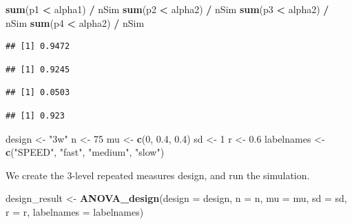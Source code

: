 \documentclass[
]{book}
\newenvironment{Shaded}{\begin{snugshade}}{\end{snugshade}}
\newcommand{\DataTypeTok}[1]{\textcolor[rgb]{0.13,0.29,0.53}{#1}}
\newcommand{\DecValTok}[1]{\textcolor[rgb]{0.00,0.00,0.81}{#1}}
\newcommand{\FloatTok}[1]{\textcolor[rgb]{0.00,0.00,0.81}{#1}}
\newcommand{\KeywordTok}[1]{\textcolor[rgb]{0.13,0.29,0.53}{\textbf{#1}}}
\newcommand{\NormalTok}[1]{#1}
\newcommand{\OperatorTok}[1]{\textcolor[rgb]{0.81,0.36,0.00}{\textbf{#1}}}
\newcommand{\StringTok}[1]{\textcolor[rgb]{0.31,0.60,0.02}{#1}}
\begin{document}
\begin{Shaded}
\begin{Highlighting}[]
\KeywordTok{sum}\NormalTok{(p1 }\OperatorTok{<}\StringTok{ }\NormalTok{alpha1) }\OperatorTok{/}\StringTok{ }\NormalTok{nSim}
\KeywordTok{sum}\NormalTok{(p2 }\OperatorTok{<}\StringTok{ }\NormalTok{alpha2) }\OperatorTok{/}\StringTok{ }\NormalTok{nSim}
\KeywordTok{sum}\NormalTok{(p3 }\OperatorTok{<}\StringTok{ }\NormalTok{alpha2) }\OperatorTok{/}\StringTok{ }\NormalTok{nSim}
\KeywordTok{sum}\NormalTok{(p4 }\OperatorTok{<}\StringTok{ }\NormalTok{alpha2) }\OperatorTok{/}\StringTok{ }\NormalTok{nSim}
\end{Highlighting}
\end{Shaded}

\begin{verbatim}
## [1] 0.9472
\end{verbatim}

\begin{verbatim}
## [1] 0.9245
\end{verbatim}

\begin{verbatim}
## [1] 0.0503
\end{verbatim}

\begin{verbatim}
## [1] 0.923
\end{verbatim}

\begin{Shaded}
\begin{Highlighting}[]
\NormalTok{design <-}\StringTok{ "3w"}
\NormalTok{n <-}\StringTok{ }\DecValTok{75}
\NormalTok{mu <-}\StringTok{ }\KeywordTok{c}\NormalTok{(}\DecValTok{0}\NormalTok{, }\FloatTok{0.4}\NormalTok{, }\FloatTok{0.4}\NormalTok{)}
\NormalTok{sd <-}\StringTok{ }\DecValTok{1}
\NormalTok{r <-}\StringTok{ }\FloatTok{0.6}
\NormalTok{labelnames <-}\StringTok{ }\KeywordTok{c}\NormalTok{(}\StringTok{"SPEED"}\NormalTok{, }
                \StringTok{"fast"}\NormalTok{, }\StringTok{"medium"}\NormalTok{, }\StringTok{"slow"}\NormalTok{)}
\end{Highlighting}
\end{Shaded}

We create the 3-level repeated measures design, and run the simulation.

\begin{Shaded}
\begin{Highlighting}[]
\NormalTok{design_result <-}\StringTok{ }\KeywordTok{ANOVA_design}\NormalTok{(}\DataTypeTok{design =}\NormalTok{ design,}
                   \DataTypeTok{n =}\NormalTok{ n, }
                   \DataTypeTok{mu =}\NormalTok{ mu, }
                   \DataTypeTok{sd =}\NormalTok{ sd, }
                   \DataTypeTok{r =}\NormalTok{ r, }
                   \DataTypeTok{labelnames =}\NormalTok{ labelnames)}
\end{Highlighting}
\end{Shaded}
\end{document}
